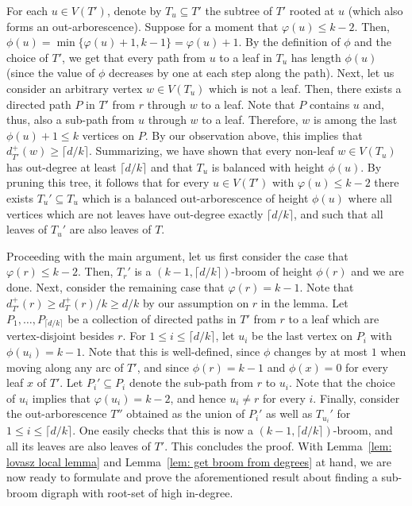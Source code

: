 \documentclass[a4paper,11pt]{article}
\makeatletter
\renewenvironment{proof}[1][\proofname] {\par\pushQED{\qed}\normalfont\topsep6\p@\@plus6\p@\relax\trivlist\item[\hskip\labelsep\bfseries#1\@addpunct{.}]\ignorespaces}{\popQED\endtrivlist\@endpefalse}
\theoremstyle{definition}
\makeatother
\begin{document}
\begin{proof}
    For each $u\in V(T')$, denote by $T_u\subseteq T'$ the subtree of $T'$ rooted at $u$ (which also forms an out-arborescence). Suppose for a moment that $\varphi(u)\leq k-2$. Then, $\phi(u)=\min\{\varphi(u)+1,k-1\}=\varphi(u)+1$. By the definition of $\phi$ and the choice of $T'$, we get that every path from $u$ to a leaf in $T_u$ has length $\phi(u)$ (since the value of $\phi$ decreases by one at each step along the path).  Next, let us consider an arbitrary vertex $w\in V(T_u)$ which is not a leaf. Then, there exists a directed path $P$ in $T'$ from $r$ through $w$ to a leaf. Note that $P$ contains $u$ and, thus, also a sub-path from $u$ through $w$ to a leaf. Therefore, $w$ is among the last $\phi(u)+1\leq k$ vertices on $P$. By our observation above, this implies that $d_{T'}^+(w)\geq \lceil d/k\rceil$. Summarizing, we have shown that every non-leaf $w\in V(T_u)$ has out-degree at least $\lceil d/k\rceil$ and that $T_u$ is balanced with height $\phi(u)$. By pruning this tree, it follows that for every $u\in V(T')$ with $\varphi(u)\leq k-2$ there exists $T_u'\subseteq T_u$ which is a balanced out-arborescence of height $\phi(u)$ where all vertices which are not leaves have out-degree exactly $\lceil d/k\rceil$, and such that all leaves of $T_u'$ are also leaves of $T$. 
    
    Proceeding with the main argument, let us first consider the case that $\varphi(r)\leq k-2$. Then, $T_r'$ is a $(k-1,\lceil d/k\rceil)$-broom of height $\phi(r)$ and we are done. Next, consider the remaining case that $\varphi(r)=k-1$. Note that $d_{T'}^+(r)\ge d_T^+(r)/k\ge d/k$ by our assumption on $r$ in the lemma. Let $P_1,\ldots,P_{\lceil d/k\rceil}$ be a collection of directed paths in $T'$ from $r$ to a leaf which are vertex-disjoint besides $r$. For $1\leq i\leq \lceil d/k\rceil$, let $u_i$ be the last vertex on $P_i$ with $\phi(u_i)=k-1$. Note that this is well-defined, since $\phi$ changes by at most $1$ when moving along any arc of $T'$, and since $\phi(r)=k-1$ and $\phi(x)=0$ for every leaf $x$ of $T'$. Let $P_i'\subseteq P_i$ denote the sub-path from $r$ to $u_i$. Note that the choice of $u_i$ implies that $\varphi(u_i)=k-2$, and hence $u_i\neq r$ for every $i$. 
    Finally, consider the out-arborescence $T''$ obtained as the union of $P_i'$ as well as $T_{u_i}'$ for $1\leq i\leq \lceil d/k\rceil$. One easily checks that this is now a $(k-1,\lceil d/k\rceil)$-broom, and all its leaves are also leaves of $T'$. This concludes the proof.
\end{proof}
With Lemma~\ref{lem: lovasz local lemma} and Lemma~\ref{lem: get broom from degrees} at hand, we are now ready to formulate and prove the aforementioned result about finding a sub-broom digraph with root-set of high in-degree.
\end{document}
